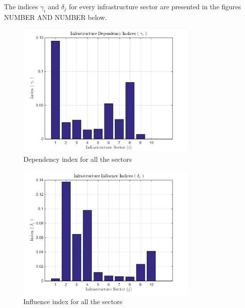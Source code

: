 \documentclass[11pt,a4paper]{article}
\begin{document}
The indices $\gamma_i$ and $\delta_j$ for every infrastructure sector are presented in the figures NUMBER AND NUMBER below.

\begin{figure}
	\label{fig: Gamma}
	\centering
	\includegraphics[width=0.8\textwidth]
    {gamma.png}
    \caption{Dependency index for all the sectors}
\end{figure}

\begin{figure}
	\label{fig: Delta}
	\centering
	\includegraphics[width=0.8\textwidth]
    {delta.png}
    \caption{Influence index for all the sectors}
\end{figure}
\end{document}
